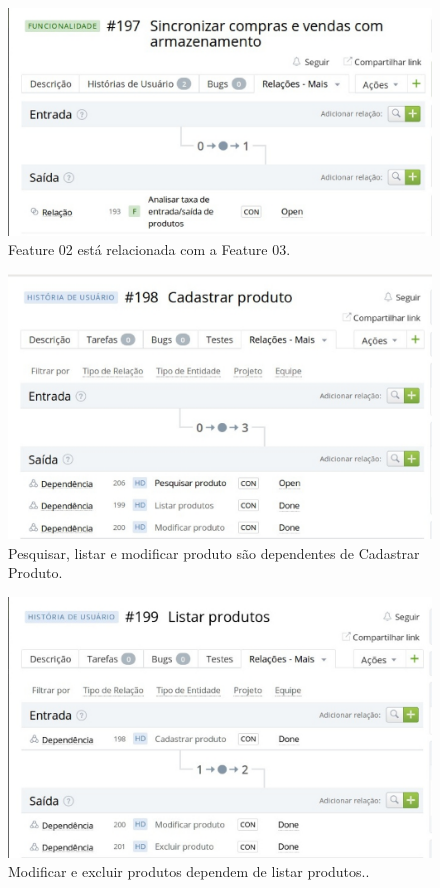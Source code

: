 \begin{figure}[!htpb]
\centering
\includegraphics[scale=0.45]{figuras/gerenciamento/us}
\caption{Feature 02 está relacionada com a Feature 03.}
\end{figure}

\begin{figure}[!htpb]
\centering
\includegraphics[scale=0.45]{figuras/gerenciamento/foto}
\caption{Pesquisar, listar e modificar produto são dependentes de Cadastrar Produto.}
\end{figure}

\begin{figure}[!htpb]
\centering
\includegraphics[scale=0.45]{figuras/gerenciamento/foto_3_}
\caption{Modificar e excluir produtos dependem de listar produtos..}
\end{figure}

